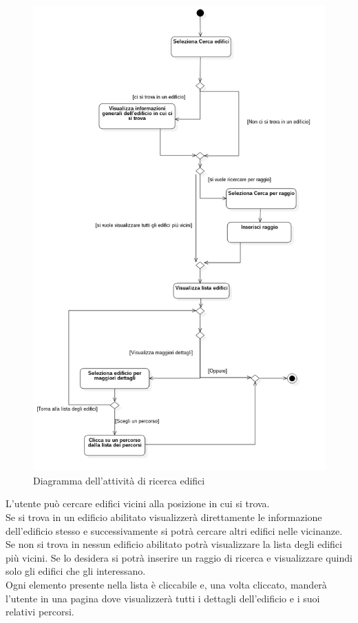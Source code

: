 \begin{figure}[!h]
	\centering
	\includegraphics[scale=0.4]{img/attivita/edifici}  
	\caption{Diagramma dell'attività di ricerca edifici}
\end{figure}

L'utente può cercare edifici vicini alla posizione in cui si trova. \\ 
Se si trova in un edificio abilitato visualizzerà direttamente le informazione dell'edificio stesso e successivamente si potrà cercare altri edifici nelle vicinanze. \\ 
Se non si trova in nessun edificio abilitato potrà visualizzare la lista degli edifici più vicini. Se lo desidera si potrà inserire un raggio di ricerca e visualizzare quindi solo gli edifici che gli interessano. \\
Ogni elemento presente nella lista è cliccabile e, una volta cliccato, manderà l'utente in una pagina dove visualizzerà tutti i dettagli dell'edificio e i suoi relativi percorsi.
